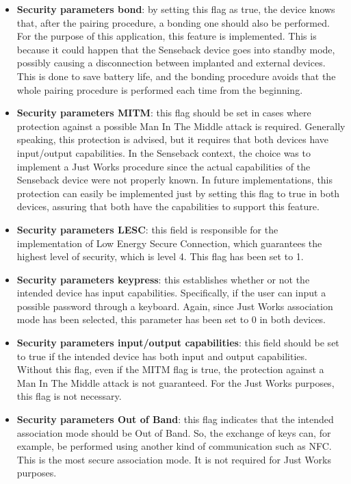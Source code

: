 \documentclass{Configuration_Files/PoliMi3i_thesis}
\begin{document}
\begin{itemize}
    \item \textbf{Security parameters bond}: by setting this flag as true, the device knows that, after the pairing procedure, a bonding one should also be performed. For the purpose of this application, this feature is implemented. This is because it could happen that the Senseback device goes into standby mode, possibly causing a disconnection between implanted and external devices. This is done to save battery life, and the bonding procedure avoids that the whole pairing procedure is performed each time from the beginning.
    \item \textbf{Security parameters MITM}: this flag should be set in cases where protection against a possible Man In The Middle attack is required. Generally speaking, this protection is advised, but it requires that both devices have input/output capabilities. In the Senseback context, the choice was to implement a Just Works procedure since the actual capabilities of the Senseback device were not properly known. In future implementations, this protection can easily be implemented just by setting this flag to true in both devices, assuring that both have the capabilities to support this feature.
    \item \textbf{Security parameters LESC}: this field is responsible for the implementation of Low Energy Secure Connection, which guarantees the highest level of security, which is level 4. This flag has been set to 1.
    \item \textbf{Security parameters keypress}: this establishes whether or not the intended device has input capabilities. Specifically, if the user can input a possible password through a keyboard. Again, since Just Works association mode has been selected, this parameter has been set to 0 in both devices.
    \item \textbf{Security parameters input/output capabilities}: this field should be set to true if the intended device has both input and output capabilities. Without this flag, even if the MITM flag is true, the protection against a Man In The Middle attack is not guaranteed. For the Just Works purposes, this flag is not necessary.
    \item \textbf{Security parameters Out of Band}: this flag indicates that the intended association mode should be Out of Band. So, the exchange of keys can, for example, be performed using another kind of communication such as NFC. This is the most secure association mode. It is not required for Just Works purposes.

\end{itemize}
\end{document}
